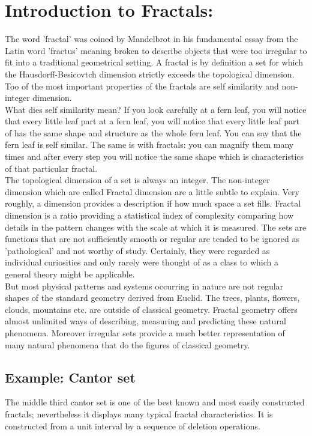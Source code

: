 \documentclass[14pt]{extarticle}
\begin{document}
\section{Introduction to Fractals:}
The word 'fractal' was coined by Mandelbrot in his fundamental essay from the Latin word 'fractus' meaning broken to describe objects that were too irregular to fit into a traditional geometrical setting. A fractal is by definition a set for which the Hausdorff-Besicovtch dimension strictly exceeds the topological dimension.\\
Too of the most important properties of the fractals are self similarity and non-integer dimension.\\
 What dies self similarity mean? If you look carefully at a fern leaf, you will notice that every little leaf part at a fern leaf, you will notice that every little leaf part of has the same shape and structure as the whole fern leaf. You can say that the fern leaf is self similar. The same is with fractals: you can magnify them many times and after every step you will notice the same shape which is characteristics of that particular fractal. \\
The topological dimension of a set is always an integer. The non-integer dimension which are called Fractal dimension are a little subtle to explain. Very roughly, a dimension provides a description if how much space a set fills. Fractal dimension is a ratio providing a statistical index of complexity comparing how details in the pattern changes with the scale at which it is measured. The sets are functions that are not sufficiently smooth or regular are tended to be ignored as 'pathological' and not worthy of study. Certainly, they were regarded as individual curiosities and only rarely were thought of as a class to which a general theory might be applicable.\\
But most physical patterns and systems occurring in nature are not regular shapes of the standard geometry derived from Euclid. The trees, plants, flowers, clouds, mountains etc. are outside of classical geometry. Fractal geometry offers almost unlimited ways of describing, measuring and predicting these natural phenomena. Moreover irregular sets provide a much better representation of many natural phenomena that do the figures of classical geometry.

\newpage


\subsection{Example: Cantor set}
The middle third cantor set is one of the best known and most easily constructed fractals; nevertheless it displays many typical fractal characteristics. It is constructed from a unit interval by a sequence of deletion operations.\\
\end{document}
